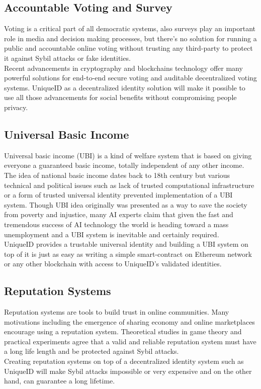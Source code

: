 \documentclass[conference]{IEEEtran}
\begin{document}
\subsection{Accountable Voting and Survey}
Voting is a critical part of all democratic systems, also surveys play an important role in media and decision making processes, but there's no solution for running a public and accountable online voting without trusting any third-party to protect it against Sybil attacks or fake identities.\\
Recent advancements in cryptography and blockchains technology offer many powerful solutions for end-to-end secure voting and auditable decentralized voting systems. UniqueID as a decentralized identity solution will make it possible to use all those advancements for social benefits without compromising people privacy.

\subsection{Universal Basic Income}
Universal basic income (UBI) is a kind of welfare system that is based on giving everyone a guaranteed basic income, totally independent of any other income. The idea of national basic income dates back to 18th century but various technical and political issues such as lack of trusted computational infrastructure or a form of trusted universal identity prevented implementation of a UBI system. Though UBI idea originally was presented as a way to save the society from poverty and injustice, many AI experts claim that given the fast and tremendous success of AI technology the world is heading toward a mass unemployment and a UBI system is inevitable and certainly required.\\
UniqueID provides a trustable universal identity and building a UBI system on top of it is just as easy as writing a simple smart-contract on Ethereum network or any other blockchain with access to UniqueID's validated identities. 

\subsection{Reputation Systems}
Reputation systems are tools to build trust in online communities. Many motivations including the emergence of sharing economy and online marketplaces encourage using a reputation system. Theoretical studies in game theory and practical experiments agree that a valid and reliable reputation system must have a long life length and be protected against Sybil attacks. \\
Creating reputation systems on top of a decentralized identity system such as UniqueID will make Sybil attacks impossible or very expensive and on the other hand, can guarantee a long lifetime.
\end{document}
